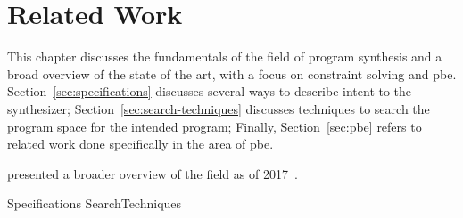 \chapter{Related Work}
\label{chapter:relatedWork}

This chapter discusses the fundamentals of the field of program synthesis and a
broad overview of the state of the art, with a focus on constraint solving and
\gls{pbe}.
Section~\ref{sec:specifications} discusses several ways to describe intent to
the synthesizer; %
Section~\ref{sec:search-techniques} discusses techniques to search the program
space for the intended program; %
Finally, Section~\ref{sec:pbe} refers to related work done specifically in the
area of \gls{pbe}.

\citeauthor{Gulwani2017} presented a broader overview of the field as of
2017~\cite{Gulwani2017}.

{Specifications}
{SearchTechniques}
